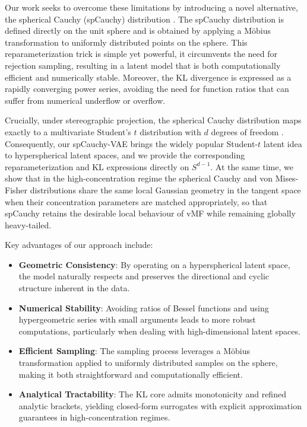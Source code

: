 \documentclass{article}
\begin{document}
Our work seeks to overcome these limitations by introducing a novel alternative, the spherical Cauchy (spCauchy) distribution \citep{spCauchy}. The spCauchy distribution is defined directly on the unit sphere and is obtained by applying a Möbius transformation to uniformly distributed points on the sphere. This reparameterization trick is simple yet powerful, it circumvents the need for rejection sampling, resulting in a latent model that is both computationally efficient and numerically stable. Moreover, the KL divergence is expressed as a rapidly converging power series, avoiding the need for function ratios that can suffer from numerical underflow or overflow.

Crucially, under stereographic projection, the spherical Cauchy distribution maps exactly to a multivariate Student's $t$ distribution with $d$ degrees of freedom \citep{spCauchy}. Consequently, our spCauchy-VAE brings the widely popular Student-$t$ latent idea to hyperspherical latent spaces, and we provide the corresponding reparameterization and KL expressions directly on $S^{d-1}$. At the same time, we show that in the high-concentration regime the spherical Cauchy and von Mises-Fisher distributions share the same local Gaussian geometry in the tangent space when their concentration parameters are matched appropriately, so that spCauchy retains the desirable local behaviour of vMF while remaining globally heavy-tailed.

Key advantages of our approach include:
\begin{itemize}
    \item \textbf{Geometric Consistency}: By operating on a hyperspherical latent space, the model naturally respects and preserves the directional and cyclic structure inherent in the data.
    \item \textbf{Numerical Stability}: Avoiding ratios of Bessel functions and using hypergeometric series with small arguments leads to more robust computations, particularly when dealing with high-dimensional latent spaces.
    \item \textbf{Efficient Sampling}: The sampling process leverages a Möbius transformation applied to uniformly distributed samples on the sphere, making it both straightforward and computationally efficient.
    \item \textbf{Analytical Tractability}: The KL core admits monotonicity and refined analytic brackets, yielding closed-form surrogates with explicit approximation guarantees in high-concentration regimes.
\end{itemize}
\end{document}
